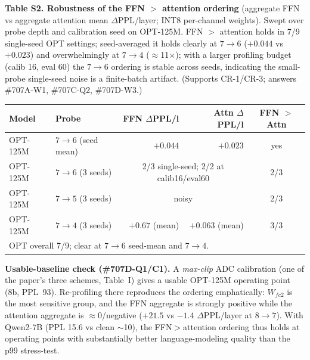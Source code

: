 \documentclass[10pt]{article}
\begin{document}
\vspace{1em}
\noindent\textbf{Table S2. Robustness of the FFN $>$ attention ordering}
(aggregate FFN vs aggregate attention mean $\Delta$PPL/layer; INT8 per-channel
weights). Swept over probe depth and calibration seed on OPT-125M.
FFN $>$ attention holds in 7/9 single-seed OPT settings; seed-averaged it
holds clearly at $7{\to}6$ ($+0.044$ vs $+0.023$) and overwhelmingly at $7{\to}4$
($\approx$11$\times$); with a larger profiling budget (calib 16, eval 60) the
$7{\to}6$ ordering is stable across seeds, indicating the small-probe single-seed
noise is a finite-batch artifact. (Supports CR-1/CR-3; answers \#707A-W1,
\#707C-Q2, \#707D-W3.)

\begin{center}
\begin{tabular}{llrrc}
\toprule
Model & Probe & FFN $\Delta$PPL/l & Attn $\Delta$PPL/l & FFN $>$ Attn \\
\midrule
OPT-125M & $7{\to}6$ (seed mean) & $+0.044$ & $+0.023$ & yes \\
OPT-125M & $7{\to}6$ (3 seeds)   & \multicolumn{2}{c}{2/3 single-seed; 2/2 at calib16/eval60} & 2/3 \\
OPT-125M & $7{\to}5$ (3 seeds)   & \multicolumn{2}{c}{noisy} & 2/3 \\
OPT-125M & $7{\to}4$ (3 seeds)   & $+0.67$ (mean) & $+0.063$ (mean) & 3/3 \\
\midrule
\multicolumn{5}{l}{OPT overall 7/9; clear at $7{\to}6$ seed-mean and $7{\to}4$.}\\
\bottomrule
\end{tabular}
\end{center}

\vspace{0.6em}
\noindent\textbf{Usable-baseline check (\#707D-Q1/C1).} A \emph{max-clip} ADC
calibration (one of the paper's three schemes, Table~I) gives a usable OPT-125M
operating point (8b, PPL~93). Re-profiling there reproduces the ordering
emphatically: $W_{fc2}$ is the most sensitive group, and the FFN aggregate is
strongly positive while the attention aggregate is $\approx$0/negative ($+21.5$ vs
$-1.4$ $\Delta$PPL/layer at $8{\to}7$). With Qwen2-7B (PPL 15.6 vs clean ${\sim}$10),
the FFN$>$attention ordering thus holds at operating points with substantially
better language-modeling quality than the p99 stress-test.
\end{document}
